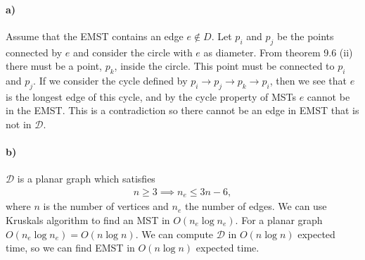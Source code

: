 \documentclass[10pt,a4paper,final,oneside,openany,article,oldfontcommands]{memoir}
\newcommand{\D}{\mathcal{D}}
\begin{document}
\paragraph{a)}
Assume that the EMST contains an edge $e \notin D$. Let $p_i$ and $p_j$ be the points connected by $e$ and consider the circle with $e$ as diameter. From theorem 9.6 (ii) there must be a point, $p_k$, inside the circle. This point must be connected to $p_i$ and $p_j$. If we consider the cycle defined by $p_i \to p_j \to p_k \to p_i$, then we see that $e$ is the longest edge of this cycle, and by the cycle property of MSTs $e$ cannot be in the EMST. This is a contradiction so there cannot be an edge in EMST that is not in $\D$.


\paragraph{b)}
$\D$ is a planar graph which satisfies
\begin{align*}
  n \ge 3 \implies n_e \le 3n - 6,
\end{align*}
where $n$ is the number of vertices and $n_e$ the number of edges. We can use Kruskals algorithm to find an MST in $O(n_e \log n_e)$. For a planar graph $O(n_e \log n_e) = O(n \log n)$. We can compute $\D$ in $O(n \log n)$ expected time, so we can find EMST in $O(n \log n)$ expected time.

\printbibliography
\end{document}
